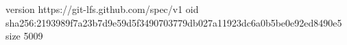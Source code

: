 version https://git-lfs.github.com/spec/v1
oid sha256:2193989f7a23b7d9e59d5f3490703779db027a11923dc6a0b5be0e92ed8490e5
size 5009
